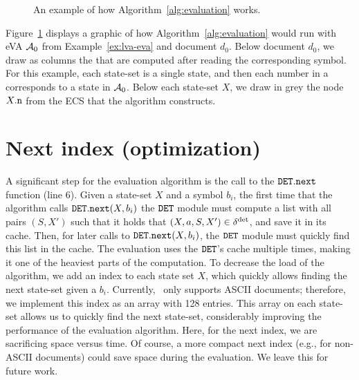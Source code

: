 \begin{figure}
	\centering
	
	\caption{An example of how Algorithm~\ref{alg:evaluation} works.}
	\label{fig:algo-run}
\end{figure}

\begin{example}
	Figure~\ref{fig:algo-run} displays a graphic of how
	Algorithm~\ref{alg:evaluation} would run with eVA $\mathcal{A}_0$ from
	Example~\ref{ex:lva-eva} and document $d_0$. Below document $d_0$, we draw
	as columns the \cstateslistss{} that are computed after reading the
	corresponding symbol. For this example, each state-set is a single state,
	and then each number in a \cstateslists{} corresponds to a state in $\mathcal{A}_0$.
	Below each state-set $X$, we draw in grey the node $X.\mathtt{n}$ from the ECS
	that the algorithm constructs.
\end{example}

\section{Next index (optimization)}
A significant step for the evaluation algorithm is the call to the
$\mathtt{DET}.\texttt{next}$ function (line 6). Given a state-set $X$ and a symbol
$b_i$, the first time that the algorithm calls $\mathtt{DET}.\texttt{next}(X, b_i)$ the
$\mathtt{DET}$ module must compute a list with all pairs $(S, X')$ such that it holds
that $(X,a,S,X') \in \delta^{\operatorname{det}}$, and save it in its cache. Then, for later
calls to  $\mathtt{DET}.\texttt{next}(X, b_i)$, the $\mathtt{DET}$ module must quickly find
this list in the cache. The evaluation uses the $\mathtt{DET}$'s cache multiple times,
making it  one of the heaviest parts of the computation. To decrease the load of
the algorithm, we add an index to each state set $X$, which quickly allows
finding the next state-set given a $b_i$. Currently, \rematch\ only supports
ASCII documents; therefore, we implement this index as an array with 128
entries. This array on each state-set allows us to quickly find the next
state-set, considerably improving the performance of the evaluation algorithm.
Here, for the next index, we are sacrificing space versus time. Of course, a
more compact next index (e.g., for non-ASCII documents) could save space during
the evaluation. We leave this for future work.

